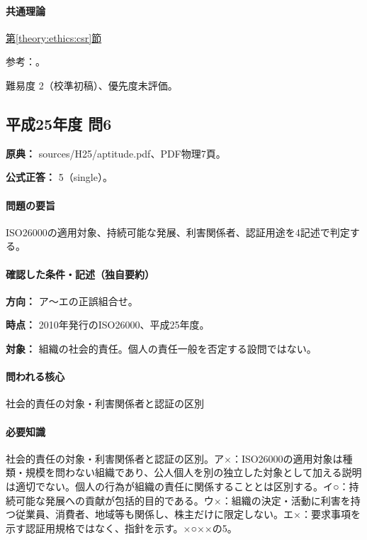 \paragraph{共通理論} \hyperref[theory:ethics:csr]{第\ref*{theory:ethics:csr}節}

\par 参考：\cite{iso26000,hbs_csv}。

\par 難易度 2（校準初稿）、優先度未評価。

\subsection{平成25年度 問6}
\label{q:h25-reg-apt-06}

\noindent\textbf{原典：} sources/H25/aptitude.pdf、PDF物理7頁。

\textbf{公式正答：} 5（single）。

\paragraph{問題の要旨} ISO26000の適用対象、持続可能な発展、利害関係者、認証用途を4記述で判定する。

\paragraph{確認した条件・記述（独自要約）}\mbox{}\par

\noindent\textbf{方向：} ア〜エの正誤組合せ。\par

\noindent\textbf{時点：} 2010年発行のISO26000、平成25年度。\par

\noindent\textbf{対象：} 組織の社会的責任。個人の責任一般を否定する設問ではない。\par

\paragraph{問われる核心} 社会的責任の対象・利害関係者と認証の区別

\paragraph{必要知識} 社会的責任の対象・利害関係者と認証の区別。ア×：ISO26000の適用対象は種類・規模を問わない組織であり、公人個人を別の独立した対象として加える説明は適切でない。個人の行為が組織の責任に関係することとは区別する。イ○：持続可能な発展への貢献が包括的目的である。ウ×：組織の決定・活動に利害を持つ従業員、消費者、地域等も関係し、株主だけに限定しない。エ×：要求事項を示す認証用規格ではなく、指針を示す。×○××の5。

